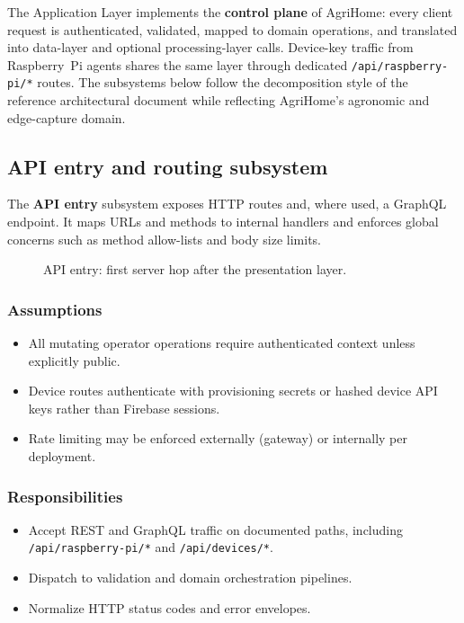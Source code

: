 The Application Layer implements the \textbf{control plane} of AgriHome: every client request is authenticated, validated, mapped to domain operations, and translated into data-layer and optional processing-layer calls. Device-key traffic from Raspberry~Pi agents shares the same layer through dedicated \texttt{/api/raspberry-pi/*} routes. The subsystems below follow the decomposition style of the reference architectural document while reflecting AgriHome's agronomic and edge-capture domain.

\subsection{API entry and routing subsystem}

The \textbf{API entry} subsystem exposes HTTP routes and, where used, a GraphQL endpoint. It maps URLs and methods to internal handlers and enforces global concerns such as method allow-lists and body size limits.

\begin{figure}[H]
\centering
{}
\caption{API entry: first server hop after the presentation layer.}
\label{fig:app-api}
\end{figure}

\subsubsection{Assumptions}
\begin{itemize}
  \item All mutating operator operations require authenticated context unless explicitly public.
  \item Device routes authenticate with provisioning secrets or hashed device API keys rather than Firebase sessions.
  \item Rate limiting may be enforced externally (gateway) or internally per deployment.
\end{itemize}

\subsubsection{Responsibilities}
\begin{itemize}
  \item Accept REST and GraphQL traffic on documented paths, including \texttt{/api/raspberry-pi/*} and \texttt{/api/devices/*}.
  \item Dispatch to validation and domain orchestration pipelines.
  \item Normalize HTTP status codes and error envelopes.
\end{itemize}

